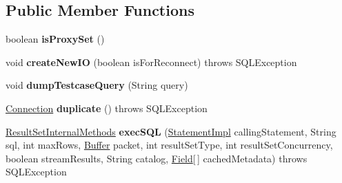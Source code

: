 \subsection*{Public Member Functions}
\begin{DoxyCompactItemize}
\item 
\mbox{\label{interfacecom_1_1mysql_1_1jdbc_1_1_my_s_q_l_connection_af70c2bdc768dc6d6408d47ec2617a35a}} 
boolean {\bfseries is\+Proxy\+Set} ()
\item 
\mbox{\label{interfacecom_1_1mysql_1_1jdbc_1_1_my_s_q_l_connection_aee45740c2df3b3a5687d344ac1f9ac34}} 
void {\bfseries create\+New\+IO} (boolean is\+For\+Reconnect)  throws S\+Q\+L\+Exception
\item 
\mbox{\label{interfacecom_1_1mysql_1_1jdbc_1_1_my_s_q_l_connection_afecaf98dc5afec429d07e8883eb2f4d7}} 
void {\bfseries dump\+Testcase\+Query} (String query)
\item 
\mbox{\label{interfacecom_1_1mysql_1_1jdbc_1_1_my_s_q_l_connection_ab71904a2479065ea15a6b2a7e72e4b11}} 
\mbox{\hyperlink{interfacecom_1_1mysql_1_1jdbc_1_1_connection}{Connection}} {\bfseries duplicate} ()  throws S\+Q\+L\+Exception
\item 
\mbox{\label{interfacecom_1_1mysql_1_1jdbc_1_1_my_s_q_l_connection_ac6326905f39da9348d36ec19b2cf000a}} 
\mbox{\hyperlink{interfacecom_1_1mysql_1_1jdbc_1_1_result_set_internal_methods}{Result\+Set\+Internal\+Methods}} {\bfseries exec\+S\+QL} (\mbox{\hyperlink{classcom_1_1mysql_1_1jdbc_1_1_statement_impl}{Statement\+Impl}} calling\+Statement, String sql, int max\+Rows, \mbox{\hyperlink{classcom_1_1mysql_1_1jdbc_1_1_buffer}{Buffer}} packet, int result\+Set\+Type, int result\+Set\+Concurrency, boolean stream\+Results, String catalog, \mbox{\hyperlink{classcom_1_1mysql_1_1jdbc_1_1_field}{Field}}\mbox{[}$\,$\mbox{]} cached\+Metadata)  throws S\+Q\+L\+Exception
\item 
\mbox{\label{interfacecom_1_1mysql_1_1jdbc_1_1_my_s_q_l_connection_a91885d396ab207b8ab1ac9f7be1bcec9}} 

\end{DoxyCompactItemize}
